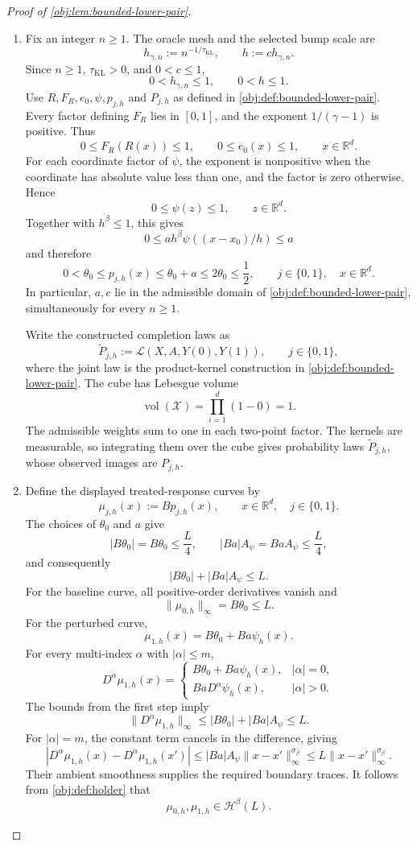 \documentclass[11pt]{article}
\begin{document}
\begin{proof}[Proof of \cref{obj:lem:bounded-lower-pair}]
\begin{enumerate}
\item Fix an integer \(n\ge1\). The oracle mesh and the selected bump scale are
\[
h_{\gamma,n}:=n^{-1/\tau_{\mathrm{KL}}},
\qquad
h:=ch_{\gamma,n}.
\]
Since \(n\ge1\), \(\tau_{\mathrm{KL}}>0\), and \(0<c\le1\),
\[
0<h_{\gamma,n}\le1,
\qquad
0<h\le1.
\]
Use \(R,F_R,e_0,\psi,p_{j,h}\) and \(P_{j,h}\) as defined in
\cref{obj:def:bounded-lower-pair}. Every factor defining \(F_R\) lies in
\([0,1]\), and the exponent \(1/(\gamma-1)\) is positive. Thus
\[
0\le F_R(R(x))\le1,
\qquad
0\le e_0(x)\le1,
\qquad x\in\mathbb R^d.
\]
For each coordinate factor of \(\psi\), the exponent is nonpositive when
the coordinate has absolute value less than one, and the factor is zero
otherwise. Hence
\[
0\le\psi(z)\le1,
\qquad z\in\mathbb R^d.
\]
Together with \(h^\beta\le1\), this gives
\[
0\le ah^\beta\psi((x-x_0)/h)\le a
\]
and therefore
\[
0<\theta_0\le p_{j,h}(x)
\le\theta_0+a
\le2\theta_0
\le\frac12,
\qquad j\in\{0,1\},\quad x\in\mathbb R^d.
\]
In particular, \(a,c\) lie in the admissible domain of
\cref{obj:def:bounded-lower-pair}, simultaneously for every \(n\ge1\).

Write the constructed completion laws as
\[
\widetilde P_{j,h}:=
\mathcal L(X,A,Y(0),Y(1)),
\qquad j\in\{0,1\},
\]
where the joint law is the product-kernel construction in
\cref{obj:def:bounded-lower-pair}. The cube has Lebesgue volume
\[
\operatorname{vol}(\mathcal X)=\prod_{i=1}^{d}(1-0)=1.
\]
The admissible weights sum to one in each two-point factor. The kernels
are measurable, so integrating them over the cube gives probability
laws \(\widetilde P_{j,h}\), whose observed images are \(P_{j,h}\).

\item Define the displayed treated-response curves by
\[
\mu_{j,h}(x):=Bp_{j,h}(x),
\qquad x\in\mathbb R^d,\quad j\in\{0,1\}.
\]
The choices of \(\theta_0\) and \(a\) give
\[
|B\theta_0|=B\theta_0\le\frac L4,
\qquad
|Ba|A_\psi=BaA_\psi\le\frac L4,
\]
and consequently
\[
|B\theta_0|+|Ba|A_\psi\le L.
\]
For the baseline curve, all positive-order derivatives vanish and
\[
\|\mu_{0,h}\|_\infty=B\theta_0\le L.
\]
For the perturbed curve,
\[
\mu_{1,h}(x)=B\theta_0+Ba\psi_h(x).
\]
For every multi-index \(\alpha\) with \(|\alpha|\le m\),
\[
D^\alpha\mu_{1,h}(x)
=
\begin{cases}
B\theta_0+Ba\psi_h(x),&|\alpha|=0,\\
BaD^\alpha\psi_h(x),&|\alpha|>0.
\end{cases}
\]
The bounds from the first step imply
\[
\|D^\alpha\mu_{1,h}\|_\infty
\le |B\theta_0|+|Ba|A_\psi
\le L.
\]
For \(|\alpha|=m\), the constant term cancels in the difference, giving
\[
|D^\alpha\mu_{1,h}(x)-D^\alpha\mu_{1,h}(x')|
\le |Ba|A_\psi\|x-x'\|_\infty^{\sigma_\beta}
\le L\|x-x'\|_\infty^{\sigma_\beta}.
\]
Their ambient smoothness supplies the required boundary traces.
It follows from \cref{obj:def:holder} that
\[
\mu_{0,h},\mu_{1,h}\in\mathcal H^\beta(L).
\]


\end{enumerate}
\end{proof}
\end{document}
